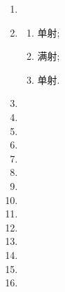\documentclass[a4paper, 11pt]{ctexart}
\begin{document}
    \begin{enumerate}
        \item %
        \item %
            \begin{multicols}{3}
                \begin{enumerate}[(1)]
                    \item %
                        单射;
                    \item %
                        满射;
                    \item %
                        单射.
                \end{enumerate}
            \end{multicols}
        \item %
        \item %
        \item %
        \item %
        \item %
        \item %
        \item %
        \item %
        \item %
        \item %
        \item %
        \item %
        \item %
        \item %
    \end{enumerate}
\end{document}
